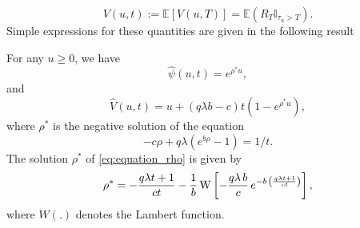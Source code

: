 \begin{equation}\label{eq:value_function_exp_time_horizon}
V(u,t):= \mathbb{E}[V(u,T)] = \mathbb{E}(R_T\mathbb{I}_{\tau_u>T}).
\end{equation} 
Simple expressions for these quantities are given in the following result 
\begin{theo}\label{theo:psi_V_T_solo_mining}
For any $u\geq0$, we have
\begin{equation*}
\widehat{\psi}(u,t) = e^{\rho^\ast u},
\end{equation*}
and 
\begin{equation*}
\widehat{V}(u,t) = u+(q\lambda b-c)t\left(1-e^{\rho^\ast u }\right),
\end{equation*}
where $\rho^\ast$ is the negative solution of the equation
\begin{equation}\label{eq:equation_rho}
-c\rho + q\lambda(e^{b\rho}-1) = 1/t.
\end{equation}
The solution $\rho^\ast$ of \eqref{eq:equation_rho} is given by 
\begin{equation*}
  \rho^{\ast}=-\frac{q\lambda t+1}{ct}
  -\frac{1}{b} \,{\rm W} \left[-\frac{q\lambda
    \,b}{c}\,{e^{-b\,\left(\frac{q\lambda t+1}{ct}\right)}}
  \right],
  \end{equation*}
  where $W(.)$ denotes the Lambert function.
\end{theo}
